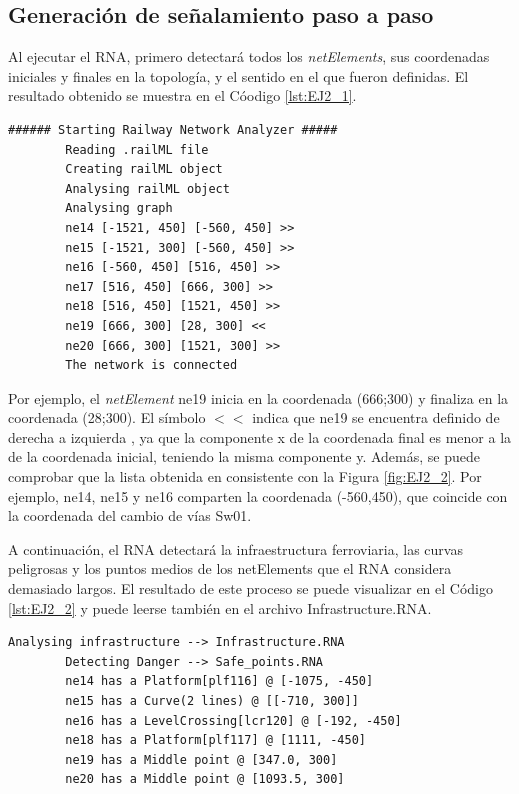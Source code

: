 \subsection{Generación de señalamiento paso a paso}

	Al ejecutar el RNA, primero detectará todos los \textit{netElements}, sus coordenadas iniciales y finales en la topología, y el sentido en el que fueron definidas. El resultado obtenido se muestra en el Cóodigo \ref{lst:EJ2_1}.
	
	\begin{lstlisting}[language = {}, caption = Detección de \textit{netElements} por parte del RNA , label = {lst:EJ2_1}]
		###### Starting Railway Network Analyzer #####
		Reading .railML file
		Creating railML object
		Analysing railML object
		Analysing graph
		ne14 [-1521, 450] [-560, 450] >>
		ne15 [-1521, 300] [-560, 450] >>
		ne16 [-560, 450] [516, 450] >>
		ne17 [516, 450] [666, 300] >>
		ne18 [516, 450] [1521, 450] >>
		ne19 [666, 300] [28, 300] <<
		ne20 [666, 300] [1521, 300] >>
		The network is connected
	\end{lstlisting}

	Por ejemplo, el \textit{netElement} ne19 inicia en la coordenada (666;300) y finaliza en la coordenada (28;300). El símbolo $<<$ indica que ne19 se encuentra definido de derecha a izquierda , ya que la componente x de la coordenada final es menor a la de la coordenada inicial, teniendo la misma componente y. Además, se puede comprobar que la lista obtenida en consistente con la Figura \ref{fig:EJ2_2}. Por ejemplo, ne14, ne15 y ne16 comparten la coordenada (-560,450), que coincide con la coordenada del cambio de vías Sw01.
	
	A continuación, el RNA detectará la infraestructura ferroviaria, las curvas peligrosas y los puntos medios de los netElements que el RNA considera demasiado largos. El resultado de este proceso se puede visualizar en el Código \ref{lst:EJ2_2} y puede leerse también en el archivo Infrastructure.RNA.
	
	\begin{lstlisting}[language = {}, caption = Detección de puntos críticos por parte del RNA , label = {lst:EJ2_2}]
		Analysing infrastructure --> Infrastructure.RNA
		Detecting Danger --> Safe_points.RNA
		ne14 has a Platform[plf116] @ [-1075, -450]
		ne15 has a Curve(2 lines) @ [[-710, 300]]
		ne16 has a LevelCrossing[lcr120] @ [-192, -450]
		ne18 has a Platform[plf117] @ [1111, -450]
		ne19 has a Middle point @ [347.0, 300]
		ne20 has a Middle point @ [1093.5, 300]
	\end{lstlisting}

